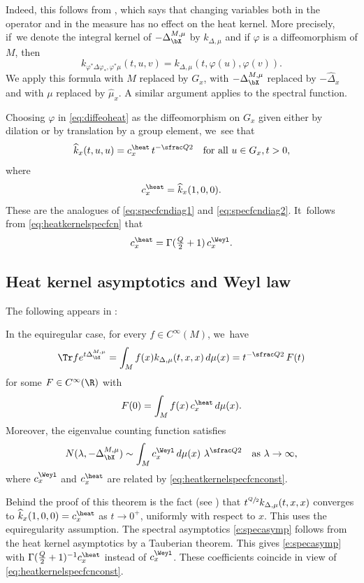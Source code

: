 Indeed, this follows from \cite[third relation in (85)]{CHT}, which says that changing variables both in the operator and in the measure has no effect on the heat kernel. More precisely, if~we denote the integral kernel of $-\Delta^{M,\mu}_\bX$ by $k_{\Delta,\mu}$ and if $\varphi$ is a diffeomorphism of $M$, then
\begin{equation}
\label{eq:diffeoheat}
k_{\varphi^* \Delta \varphi_*, \varphi^*\mu}(t,u,v)=k_{\Delta,\mu}(t,\varphi(u),\varphi(v)).
\end{equation}
We apply this formula with $M$ replaced by $G_x$, with $-\Delta^{M,\mu}_\bX$ replaced by $-\widehat\Delta_x$ and with $\mu$ replaced by $\widehat\mu_x$. A similar argument applies to the spectral function.

Choosing $\varphi$ in \eqref{eq:diffeoheat} as the diffeomorphism on $G_x$ given either by dilation or by translation by a group element, we~see that
\[
\widehat k_x(t,u,u) = c^\heat_x \,t^{-\sfrac Q2}
\quad\text{for all}\ u\in G_x,\\ t>0,
\]
where
\[
c^\heat_x = \widehat k_x(1,0,0).
\]
These are the analogues of \eqref{eq:specfcndiag1} and \eqref{eq:specfcndiag2}. It~follows from \eqref{eq:heatkernelspecfcn} that
\begin{equation}
\label{eq:heatkernelspecfcnconst}
c_x^\heat = \Gamma(\tfrac Q2+1) \,c^\Weyl_x.
\end{equation}

\subsection{Heat kernel asymptotics and Weyl law}
The following appears in \cite[Th.\,I \& 4.1]{CHT1}:

\begin{theorem}\label{weylapp}
In the equiregular case, for every $f\in C^\infty(M)$, we~have
\[
\Tr f e^{t\Delta^{M,\mu}_\bX} =
\int_M f(x)k_{\Delta,\mu}(t,x,x)\,d\mu(x) = t^{-\sfrac Q2}\,F(t)
\]
for some $F\in C^\infty(\R)$ with
\[
F(0)=\int_M f(x) \,c^\heat_x \,d\mu(x).
\]
Moreover, the eigenvalue counting function satisfies
\begin{equation}\label{e:specasymp}
N(\lambda,-\Delta^{M,\mu}_\bX)\sim \int_M c^\Weyl_x \,d\mu(x) \ \lambda^{\sfrac Q2}
\quad\text{as}\ \lambda\to\infty,
\end{equation}
where $c^\Weyl_x$ and $c^\heat_x$ are related by \eqref{eq:heatkernelspecfcnconst}.
\end{theorem}

Behind the proof of this theorem is the fact (see \cite[Th.\,C.1 and Eq.\,(96)]{CHT1}) that $t^{\sfrac Q2} k_{\Delta,\mu}(t,x,x)$ converges to $\widehat{k}_x(1,0,0)=c^\heat_x$ as $t\to 0^+$, uniformly with respect to $x$. This uses the equiregularity assumption. The spectral asymptotics \eqref{e:specasymp} follows from the heat kernel asymptotics by a Tauberian theorem. This gives \eqref{e:specasymp} with $\Gamma(\frac Q2 +1)^{-1} c^\heat_x$ instead of $c_x^\Weyl$. These coefficients coincide in view of \eqref{eq:heatkernelspecfcnconst}.
